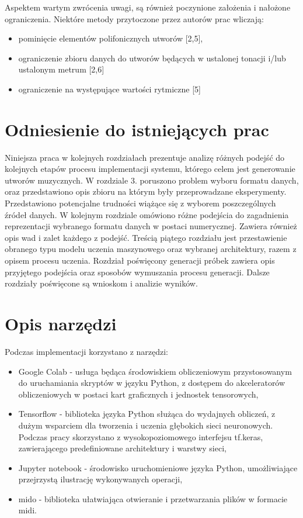 {{    Aspektem wartym zwrócenia uwagi, są również poczynione założenia i nałożone
    ograniczenia. Niektóre metody przytoczone przez autorów prac wliczają:
    \begin{itemize}
      \item pominięcie elementów polifonicznych utworów [2,5],
      \item ograniczenie zbioru danych do utworów będących w 
      ustalonej tonacji i/lub ustalonym metrum [2,6]
      \item ograniczenie na występujące wartości rytmiczne [5] 
    \end{itemize}
  }

  \section{Odniesienie do istniejących prac}
  {
    Niniejsza praca w kolejnych rozdziałach prezentuje analizę różnych podejść do kolejnych etapów
    procesu implementacji systemu, którego celem jest generowanie utworów muzycznych. 
    W rozdziale 3. poruszono problem wyboru formatu danych, oraz przedstawiono opis zbioru na którym
    były przeprowadzane eksperymenty. Przedstawiono potencjalne trudności wiążące się z wyborem
    poszczególnych źródeł danych.
    W kolejnym rozdziale omówiono różne podejścia do zagadnienia reprezentacji wybranego formatu 
    danych w postaci numerycznej. Zawiera również opis wad i zalet każdego z podejść.
    Treścią piątego rozdziału jest przestawienie obranego typu modelu uczenia maszynowego oraz 
    wybranej architektury, razem z opisem procesu uczenia.
    Rozdział poświęcony generacji próbek zawiera opis przyjętego podejścia oraz sposobów 
    wymuszania procesu generacji.
    Dalsze rozdziały poświęcone są wnioskom i analizie wyników.
  }

  \section{Opis narzędzi}
  {
    Podczas implementacji korzystano z narzędzi:
    \begin{itemize}
      \item Google Colab - usługa będąca środowiskiem obliczeniowym przystosowanym 
      do uruchamiania skryptów w języku Python, z dostępem do akceleratorów obliczeniowych
      w postaci kart graficznych i jednostek tensorowych,
      \item Tensorflow - biblioteka języka Python służąca do wydajnych obliczeń, z dużym wsparciem 
      dla tworzenia i uczenia głębokich sieci neuronowych. Podczas pracy skorzystano z 
      wysokopoziomowego interfejsu tf.keras, zawierającego predefiniowane architektury i warstwy sieci,
      \item Jupyter notebook - środowisko uruchomieniowe języka Python, umożliwiające przejrzystą
      ilustrację wykonywanych operacji,
      \item mido - biblioteka ułatwiająca otwieranie i przetwarzania plików w formacie midi.
    \end{itemize}
  }

}
